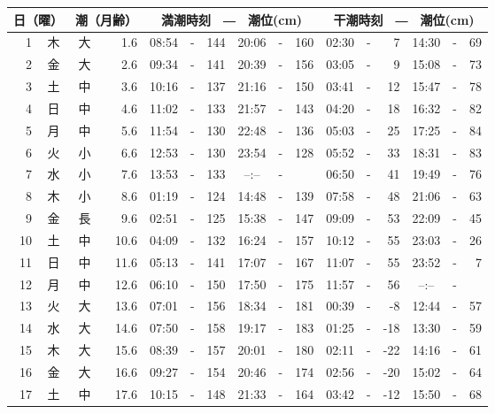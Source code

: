 \documentclass[12pt.a4j]{jsarticle}
\begin{document}
\begin{center}
\begin{table}[ht]
    \begin{tabular}{|rc|cr|ccrccr|ccrccr|}
    \hline
    \multicolumn{2}{|c|}{日（曜）} & \multicolumn{2}{c|}{潮（月齢）} & \multicolumn{6}{c|}{満潮時刻　―　潮位(cm)} & \multicolumn{6}{c|}{干潮時刻　―　潮位(cm)} \\
 \hline
 1 & 木 & 大 &  1.6 &  08:54 &-& 144  &  20:06 &-& 160  &   02:30 &-&   7  &   14:30 &-&  69  \\
 2 & 金 & 大 &  2.6 &  09:34 &-& 141  &  20:39 &-& 156  &   03:05 &-&   9  &   15:08 &-&  73  \\
 3 & 土 & 中 &  3.6 &  10:16 &-& 137  &  21:16 &-& 150  &   03:41 &-&  12  &   15:47 &-&  78  \\
 4 & 日 & 中 &  4.6 &  11:02 &-& 133  &  21:57 &-& 143  &   04:20 &-&  18  &   16:32 &-&  82  \\
 5 & 月 & 中 &  5.6 &  11:54 &-& 130  &  22:48 &-& 136  &   05:03 &-&  25  &   17:25 &-&  84  \\
 6 & 火 & 小 &  6.6 &  12:53 &-& 130  &  23:54 &-& 128  &   05:52 &-&  33  &   18:31 &-&  83  \\
 7 & 水 & 小 &  7.6 &  13:53 &-& 133  &  --:-- &-&     &   06:50 &-&  41  &   19:49 &-&  76  \\
 8 & 木 & 小 &  8.6 &  01:19 &-& 124  &  14:48 &-& 139  &   07:58 &-&  48  &   21:06 &-&  63  \\
 9 & 金 & 長 &  9.6 &  02:51 &-& 125  &  15:38 &-& 147  &   09:09 &-&  53  &   22:09 &-&  45  \\
10 & 土 & 中 & 10.6 &  04:09 &-& 132  &  16:24 &-& 157  &   10:12 &-&  55  &   23:03 &-&  26  \\
11 & 日 & 中 & 11.6 &  05:13 &-& 141  &  17:07 &-& 167  &   11:07 &-&  55  &   23:52 &-&   7  \\
12 & 月 & 中 & 12.6 &  06:10 &-& 150  &  17:50 &-& 175  &   11:57 &-&  56  &   --:-- &-&     \\
13 & 火 & 大 & 13.6 &  07:01 &-& 156  &  18:34 &-& 181  &   00:39 &-&  -8  &   12:44 &-&  57  \\
14 & 水 & 大 & 14.6 &  07:50 &-& 158  &  19:17 &-& 183  &   01:25 &-& -18  &   13:30 &-&  59  \\
15 & 木 & 大 & 15.6 &  08:39 &-& 157  &  20:01 &-& 180  &   02:11 &-& -22  &   14:16 &-&  61  \\
16 & 金 & 大 & 16.6 &  09:27 &-& 154  &  20:46 &-& 174  &   02:56 &-& -20  &   15:02 &-&  64  \\
17 & 土 & 中 & 17.6 &  10:15 &-& 148  &  21:33 &-& 164  &   03:42 &-& -12  &   15:50 &-&  68  \\

\end{tabular}
\end{table}
\end{center}
\end{document}

